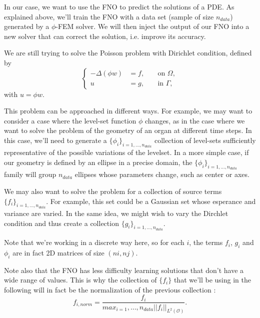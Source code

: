 In our case, we want to use the FNO to predict the solutions of a PDE. As explained above, we'll train the FNO with a data set (sample of size $n_{data}$) generated by a $\phi$-FEM solver. We will then inject the output of our FNO into a new solver that can correct the solution, i.e. improve its accuracy. 

We are still trying to solve the Poisson problem with Dirichlet condition, defined by
\begin{equation*}
	\left\{\begin{aligned}
		-\Delta (\phi w)&=f, \; &&\text{on } \Omega, \\
		u&=g, \; &&\text{in } \Gamma,
	\end{aligned}\right.
\end{equation*}
with $u=\phi w$.

This problem can be approached in different ways.
For example, we may want to consider a case where the level-set function $\phi$ changes, as in the case where we want to solve the problem of the geometry of an organ at different time steps. In this case, we'll need to generate a $\{\phi_i\}_{i=1,\dots,n_{data}}$ collection of level-sets sufficiently representative of the possible variations of the levelset. In a more simple case, if our geometry is defined by an ellipse in a precise domain, the $\{\phi_i\}_{i=1,\dots,n_{data}}$ family will group $n_{data}$ ellipses whose parameters change, such as center or axes.

We may also want to solve the problem for a collection of source terms $\{f_i\}_{i=1,\dots,n_{data}}$. For example, this set could be a Gaussian set whose esperance and variance are varied. In the same idea, we might wish to vary the Dirchlet condition and thus create a collection $\{g_i\}_{i=1,\dots,n_{data}}$.

\begin{Rem}
	Note that we're working in a discrete way here, so for each $i$, the terms $f_i$, $g_i$ and $\phi_i$ are in fact 2D matrices of size $(ni,nj)$.
\end{Rem}

\begin{Rem}
	Note also that the FNO has less difficulty learning solutions that don't have a wide range of values. This is why the collection of $\{f_i\}$ that we'll be using in the following will in fact be the normalization of the previous collection :
	\begin{equation*}
		f_{i,norm} = \frac{f_i}{max_{i=1},\dots,n_{data} ||f_i||_{L^2(\mathcal{O})}}.
	\end{equation*}
\end{Rem}

